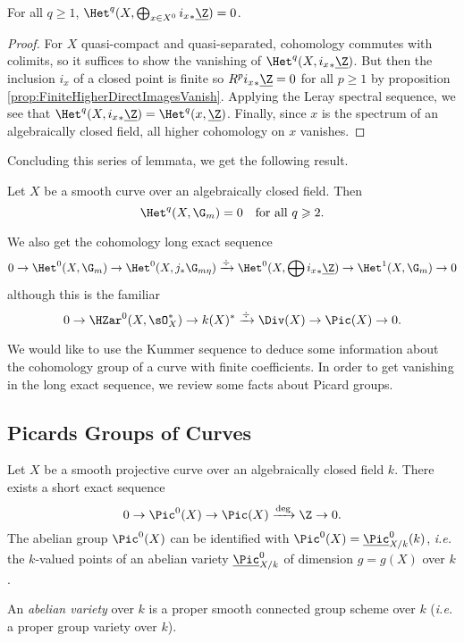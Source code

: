 \begin{lem}
For all $q \geqslant 1$, $\Het^q(X, \bigoplus_{x \in X^0} {i_x}_* \underline{\Z}) = 0$.
\end{lem}

\begin{proof}
For $X$ quasi-compact and quasi-separated, cohomology commutes with colimits, so it suffices to show the vanishing of $\Het^q(X, {i_x}_* \underline{\Z})$. But then the inclusion $i_x$ of a closed point is finite so $R^p {i_x}_* \underline{\Z} = 0$ for all $p \geqslant 1$ by proposition \ref{prop:FiniteHigherDirectImagesVanish}. Applying the Leray spectral sequence, we see that $\Het^q(X, {i_x}_* \underline{\Z}) = \Het^q(x, \underline{\Z})$. Finally, since $x$ is the spectrum of an algebraically closed field, all higher cohomology on $x$ vanishes.
\end{proof}

Concluding this series of lemmata, we get the following result.

\begin{thm}
Let $X$ be a smooth curve over an algebraically closed field. Then 
$$
\Het^q(X, \G_m) = 0 \ \ \text{ for all } q \geqslant 2.
$$
\end{thm}

We also get the cohomology long exact sequence
$$
0 \to \Het^0(X,\G_m) \to \Het^0(X,j_*\G_{m\eta}) \xrightarrow{\div} \Het^0(X,\bigoplus {i_x}_*\underline{\Z}) \to \Het^1(X,\G_m) \to 0
$$
although this is the familiar
$$
0 \to \HZar^0(X,\sO_X^*) \to k(X)^* \xrightarrow{\div} \Div(X) \to \Pic(X) \to 0.
$$

We would like to use the Kummer sequence to deduce some information about the cohomology group of a curve with finite coefficients. In order to get vanishing in the long exact sequence, we review some facts about Picard groups.

\subsection{Picards Groups of Curves}

Let $X$ be a smooth projective curve over an algebraically closed field $k$. There exists a short exact sequence
$$
0\to \Pic^0(X) \to  \Pic(X)\xrightarrow{\deg} \Z \to 0.
$$
The abelian group $\Pic^0(X)$ can be identified with $\Pic^0(X) = \underline{\Pic}^0_{X/k}(k)$, {\it i.e.} the $k$-valued points of an abelian variety $\underline{\Pic}^0_{X/k}$ of dimension $g=g(X)$ over $k$. 

\begin{defi} 
An \emph{abelian variety} over $k$ is a proper smooth connected group scheme over $k$ ({\it i.e.} a proper group variety over $k$).
\end{defi}	

